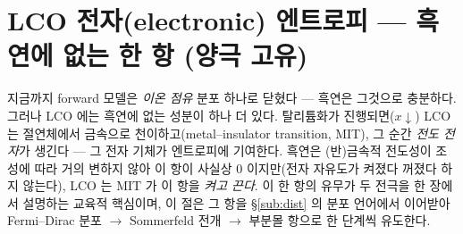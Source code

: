 \documentclass[11pt,a4paper]{article}
\begin{document}
\section{LCO 전자(electronic) 엔트로피 — 흑연에 없는 한 항 (양극 고유)}\label{sec:eentropy}
지금까지 forward 모델은 \emph{이온 점유} 분포 하나로 닫혔다 — 흑연은 그것으로 충분하다. 그러나 LCO 에는 흑연에 없는
성분이 하나 더 있다. 탈리튬화가 진행되면($x\!\downarrow$) LCO 는 절연체에서 금속으로 천이하고(metal--insulator transition,
MIT), 그 순간 \emph{전도 전자}가 생긴다 — 그 전자 기체가 엔트로피에 기여한다. 흑연은 (반)금속적 전도성이 조성에 따라 거의
변하지 않아 이 항이 사실상 $0$ 이지만(전자 자유도가 켜졌다 꺼졌다 하지 않는다), LCO 는 MIT 가 이 항을 \emph{켜고 끈다}.
이 한 항의 유무가 두 전극을 한 장에서 설명하는 교육적 핵심이며, 이 절은 그 항을 \S\ref{sub:dist} 의 분포 언어에서
이어받아 Fermi--Dirac 분포 $\to$ Sommerfeld 전개 $\to$ 부분몰 항으로 한 단계씩 유도한다.
\end{document}
